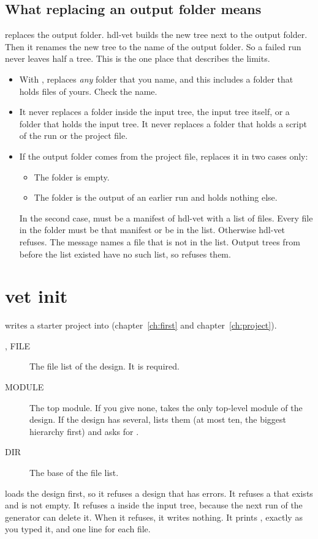 \subsection*{What replacing an output folder means}

 replaces the output folder. hdl-vet builds the new tree next to the
output folder. Then it renames the new tree to the name of the output folder. So a failed
run never leaves half a tree. This is the one place that describes the limits.

\begin{itemize}
\item With ,  replaces \emph{any} folder that you name,
  and this includes a folder that holds files of yours. Check the name.
\item It never replaces a folder inside the input tree, the input tree itself, or a
  folder that holds the input tree. It never replaces a folder that holds a script
  of the run or the project file.
\item If the output folder comes from the project file,  replaces it in
  two cases only:
  \begin{itemize}
  \item The folder is empty.
  \item The folder is the output of an earlier run and holds nothing else.
  \end{itemize}
  In the second case,  must be a manifest of hdl-vet with a list of
  files. Every file in the folder must be that manifest or be in the list. Otherwise
  hdl-vet refuses. The message names a file that is not in the list.
  Output trees from before the list existed have no such list, so  refuses
  them.
\end{itemize}

\section{vet init}

 writes a starter project into 
(chapter~\ref{ch:first} and chapter~\ref{ch:project}).

\begin{description}
\item[,  FILE] The file list of the design. It is required.
\item[ MODULE] The top module. If you give none,  takes the only
  top-level module of the design. If the design has several,  lists them
  (at most ten, the biggest hierarchy first) and asks for .
\item[ DIR] The base of the file list.
\end{description}

 loads the design first, so it refuses a design that has errors. It
refuses a  that exists and is not empty. It refuses a  inside the
input tree, because the next run of the generator can delete it. When it refuses, it writes
nothing. It prints , exactly as you typed it, and one line
 for each file.
